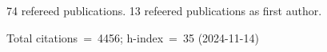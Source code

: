 74 refereed publications. 13 refeered publications as first author.

Total citations~=~4456; h-index~=~35 (2024-11-14)
